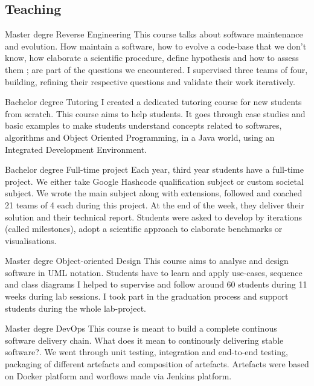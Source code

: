 \documentclass[10pt]{article} %
\begin{document}
\begin{paracol}{2}
\medskip %



\section{Teaching}

{Master degre} %
{Reverse Engineering}  %
{
This course talks about software maintenance and evolution.
How maintain a software, how to evolve a code-base that we don't know, how elaborate a scientific procedure, define hypothesis and how to assess them ; are part of the questions we encountered. I supervised three teams of four, building, refining their respective questions and validate their work iteratively.
} %

{Bachelor degree} %
{Tutoring}  %
{I created a dedicated tutoring course for new students from scratch. This course aims to help students. It goes through case studies and basic examples to make students understand concepts related to softwares, algorithms and Object Oriented Programming, in a Java world, using an Integrated Development Environment.} %

{Bachelor degree} %
{Full-time project}  %
{Each year, third year students have a full-time project. We either take Google Hashcode qualification subject or custom societal subject. We wrote the main subject along with extensions, followed and coached 21 teams of 4 each during this project. At the end of the week, they deliver their solution and their technical report. Students were asked to develop by iterations (called milestones), adopt a scientific approach to elaborate benchmarks or visualisations.} %



{Master degre} %
{Object-oriented Design}  %
{
This course aims to analyse and design software in UML notation. Students have to learn and apply use-cases, sequence and class diagrams I helped to supervise and follow around 60 students during 11 weeks during lab sessions. I took part in the graduation process and support students during the whole lab-project.
} %

{Master degre} %
{DevOps}  %
{
This course is meant to build a complete continous software delivery chain. What does it mean to continously delivering stable software?. We went through unit testing, integration and end-to-end testing, packaging of different artefacts and composition of artefacts. Artefacts were based on Docker platform and worflows made via Jenkins platform.
} %



\end{paracol}
\end{document}
